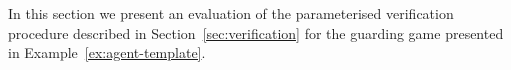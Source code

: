 
In this section we present an evaluation of the parameterised verification
procedure described in Section~\ref{sec:verification} for the guarding game
presented in Example~\ref{ex:agent-template}.

%
%
%


